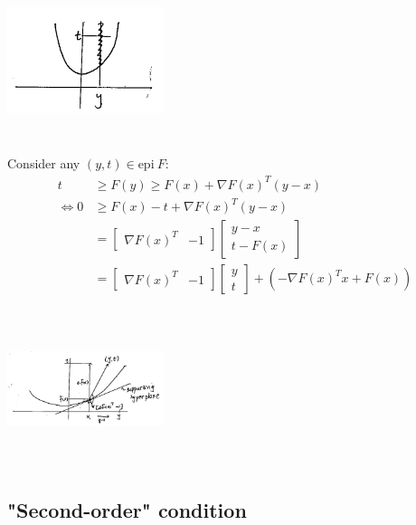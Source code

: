 \begin{marginfigure}
	\centering
	\includegraphics[width=1.8in,height=1.8in]{figures/ch08/figure1106_2.png}
\end{marginfigure}

Consider any $(y,t)\in \text{epi}\ F$:
\begin{align*}
t 
&\geq F(y) \geq F(x) + \nabla F(x)^T(y-x)\\
\Leftrightarrow 0 &\geq F(x) - t + \nabla F(x)^T(y-x)\\
&= 
\begin{bmatrix}
\nabla F(x)^T & -1
\end{bmatrix}
\begin{bmatrix}
y-x\\
t -F(x)
\end{bmatrix}\\
&= 
\begin{bmatrix}
\nabla F(x)^T  & -1
\end{bmatrix}
\begin{bmatrix}
y\\
t
\end{bmatrix} + (-\nabla F(x)^Tx + F(x))
\end{align*}

\begin{marginfigure}
	\centering
	\includegraphics[width=1.8in,height=1.8in]{figures/ch08/figure1106_3.png}
\end{marginfigure}

\subsection{"Second-order" condition}

